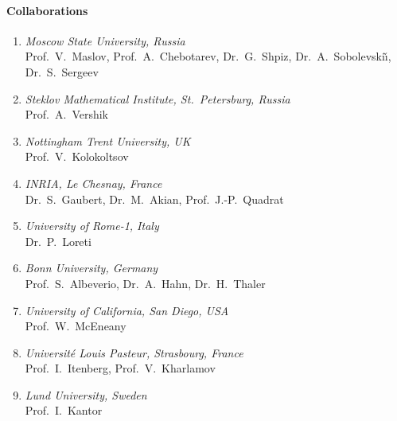 \paragraph{Collaborations}
\begin{enumerate}
\item {\sl Moscow State University, Russia} \\
  Prof.~V.~Maslov, Prof.~A.~Chebotarev, Dr.~G.~Shpiz, Dr.~A.~Sobolevski\v\i,
  Dr.~S.~Sergeev
\item {\sl Steklov Mathematical Institute, St.~Petersburg, Russia} \\
  Prof.~A.~Vershik
\item {\sl Nottingham Trent University, UK} \\
  Prof.~V.~Kolokoltsov
\item {\sl INRIA, Le Chesnay, France} \\
  Dr.~S.~Gaubert, Dr.~M.~Akian, Prof.~J.-P.~Quadrat
\item {\sl University of Rome-1, Italy} \\
  Dr.~P.~Loreti
\item {\sl Bonn University, Germany} \\
  Prof.~S.~Albeverio, Dr.~A.~Hahn, Dr.~H.~Thaler
\item {\sl University of California, San Diego, USA} \\
  Prof.~W.~McEneany
\item {\sl Universit\'e Louis Pasteur, Strasbourg, France} \\
  Prof.~I.~Itenberg, Prof.~V.~Kharlamov
\item {\sl Lund University, Sweden} \\
  Prof.~I.~Kantor
\end{enumerate}


\nocite{Litvinov1,Litvinov2,Litvinov3,Litvinov4,Litvinov5,Litvinov6}
